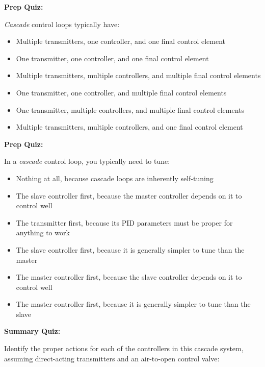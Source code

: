 \vfil \eject

\noindent
{\bf Prep Quiz:}

{\it Cascade} control loops typically have:

\begin{itemize}
\item{} Multiple transmitters, one controller, and one final control element
\vskip 5pt 
\item{} One transmitter, one controller, and one final control element
\vskip 5pt 
\item{} Multiple transmitters, multiple controllers, and multiple final control elements
\vskip 5pt 
\item{} One transmitter, one controller, and multiple final control elements
\vskip 5pt 
\item{} One transmitter, multiple controllers, and multiple final control elements
\vskip 5pt 
\item{} Multiple transmitters, multiple controllers, and one final control element
\end{itemize}



\vfil \eject

\noindent
{\bf Prep Quiz:}

In a {\it cascade} control loop, you typically need to tune:

\begin{itemize}
\item{} Nothing at all, because cascade loops are inherently self-tuning
\vskip 5pt 
\item{} The slave controller first, because the master controller depends on it to control well
\vskip 5pt 
\item{} The transmitter first, because its PID parameters must be proper for anything to work
\vskip 5pt 
\item{} The slave controller first, because it is generally simpler to tune than the master
\vskip 5pt 
\item{} The master controller first, because the slave controller depends on it to control well
\vskip 5pt 
\item{} The master controller first, because it is generally simpler to tune than the slave
\end{itemize}


\vfil \eject

\noindent
{\bf Summary Quiz:}

Identify the proper actions for each of the controllers in this cascade system, assuming direct-acting transmitters and an air-to-open control valve:

